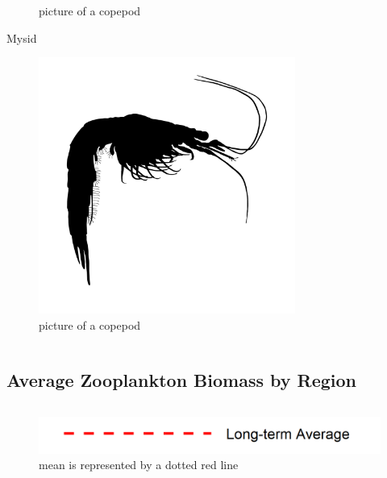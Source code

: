 \documentclass[
]{book}
\begin{document}
\begin{columns-nocenter}
\begin{column}
\begin{figure}
{}

\caption{picture of a copepod}\label{fig:unnamed-chunk-112}
\end{figure}

Mysid

\begin{figure}

{\centering \includegraphics[width=3.31in]{figures/mysid} 

}

\caption{picture of a copepod}\label{fig:unnamed-chunk-113}
\end{figure}

\end{column}

\end{columns-nocenter}

\hypertarget{average-zooplankton-biomass-by-region}{%
\subsection{Average Zooplankton Biomass by Region}\label{average-zooplankton-biomass-by-region}}

\begin{columns-nocenter}

\begin{column}

\begin{figure}
\includegraphics[width=15.25in]{figures/mline} \caption{mean is represented by a dotted red line}\label{fig:unnamed-chunk-114}
\end{figure}

\end{column}

\begin{column}

\end{column}

\begin{column}

\end{column}

\end{columns-nocenter}
\end{document}
